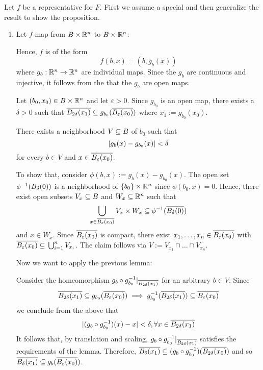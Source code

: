 \begin{myproof}
    Let $f$ be a representative for $F$.
    First we assume a special and then generalize the result to show the proposition.
    \begin{enumerate}
        \item Let $f$ map from $B \times \mathbb{R}^n$ to $B \times \mathbb{R}^n$:
        
        Hence, $f$ is of the form
        \[ f(b, x) = (b, g_b(x)) \]
        where $g_b: \mathbb{R}^n \to \mathbb{R}^n$ are individual maps.
        Since the $g_b$ are continuous and injective, it follows from the  that the $g_b$ are open maps.
        
        Let $(b_0, x_0) \in B \times \mathbb{R}^n$ and let $\varepsilon > 0$.
        Since $g_{b_0}$ is an open map, there exists a $\delta > 0$ such that
        $\clball[2\delta][x_1] \sub g_{b_0}(\clball[\varepsilon][x_0])$ where $x_1 := g_{b_0}(x_0)$.

        There exists a neighborhood $V \subseteq{} B$ of $b_0$ such that
        \[ \vert{} g_b(x) - g_{b_0}(x) \vert{} < \delta \]
        for every $b \in V$ and $x \in \clball[\varepsilon][x_0]$.
        
        To show that, consider $\phi(b, x) := g_b(x) - g_{b_0}(x)$.
        The open set $\phi^{-1}(\ball[\delta])$ is a neighborhood of $\{b_0\} \times \mathbb{R}^n$ since $\phi(b_0, x) = 0$.
        Hence, there exist open subsets $V_x \subseteq{} B$ and $W_x \subseteq{} \mathbb{R}^n$ such that
        \[ \bigcup_{x \in \clball[\varepsilon][x_0]} V_x \times W_x \sub \inv{\phi}(\clball[\delta]) \]
        and $x \in W_x$.
        Since $\clball[\varepsilon][x_0]$ is compact, there exist $x_1, \dots, x_n \in \clball[\varepsilon][x_0]$ with $\clball[\varepsilon][x_0] \sub \bigcup_{i = 1}^{n} V_{x_i}$.
        The claim follows via $V := V_{x_1} \cap \dots \cap V_{x_n}$.

        Now we want to apply the previous lemma:

        Consider the homeomorphism $g_b \circ \inv{g_{b_0}}\restr{\clball[2\delta][x_1]}$ for an arbitrary $b \in V$.
        Since
        \[ \clball[2\delta][x_1] \sub g_{b_0}(\clball[\varepsilon][x_0]) \implies g_{b_0}^{-1}(\clball[2\delta][x_1]) \sub \clball[\varepsilon][x_0] \]
        we conclude from the above that
        \[ \abs{(g_b \circ g_{b_0}^{-1})(x) - x} < \delta, \forall x \in \clball[2\delta][x_1] \]
        It follows that, by translation and scaling, $g_b \circ g_{b_0}^{-1}\restr{\clball[2\delta][x_1]}$ satisfies the requirements of the lemma.
        Therefore, $\clball[\delta][x_1] \sub (g_b \circ g_{b_0}^{-1})(\clball[2\delta][x_0])$ and so $\clball[\delta][x_1] \sub g_b(\clball[\varepsilon][x_0])$.


\end{enumerate}
\end{myproof}

